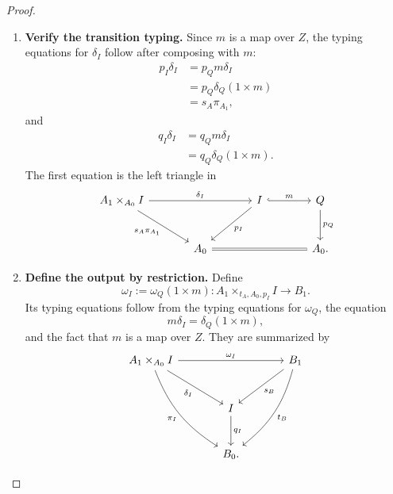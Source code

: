 \begin{proof}
\begin{enumerate}
        \item \textbf{Verify the transition typing.}
        Since \(m\) is a map over \(Z\), the typing equations for \(\delta_I\)
        follow after composing with \(m\):
        \[
        \begin{aligned}
            p_I\delta_I
            &=
            p_Qm\delta_I \\
            &=
            p_Q\delta_Q(1\times m) \\
            &=
            s_A\pi_{A_1},
        \end{aligned}
        \]
        and
        \[
        \begin{aligned}
            q_I\delta_I
            &=
            q_Qm\delta_I \\
            &=
            q_Q\delta_Q(1\times m).
        \end{aligned}
        \]
        The first equation is the left triangle in
        \[
        \begin{tikzcd}[column sep=large, row sep=large]
            A_1\times_{A_0}I
                \arrow[rr, "\delta_I"]
                \arrow[dr, "{s_A\pi_{A_1}}"']
            &&
            I
                \arrow[dl, "p_I"]
                \arrow[r, hook, "m"]
            &
            Q
                \arrow[d, "p_Q"]
            \\
            &
            A_0
                \arrow[rr, equal]
            &&
            A_0 .
        \end{tikzcd}
        \]

        \item \textbf{Define the output by restriction.}
        Define
        \[
            \omega_I :=
            \omega_Q(1\times m):
            A_1\times_{t_A,A_0,p_I}I\to B_1.
        \]
        Its typing equations follow from the typing equations for
        \(\omega_Q\), the equation
        \[
            m\delta_I=\delta_Q(1\times m),
        \]
        and the fact that \(m\) is a map over \(Z\). They are summarized by
        \[
        \begin{tikzcd}[column sep=large, row sep=large]
            A_1\times_{A_0}I
                \arrow[rr, "\omega_I"]
                \arrow[dr, "\delta_I"']
                \arrow[ddr, "\pi_I"', bend right=18]
            &&
            B_1
                \arrow[dl, "s_B"]
                \arrow[ddl, "t_B", bend left=18]
            \\
            &
            I
                \arrow[d, "q_I"]
            &
            \\
            &
            B_0 .
        \end{tikzcd}
        \]


\end{enumerate}
\end{proof}
